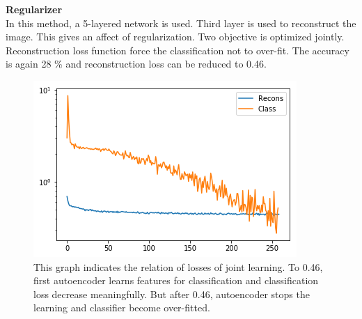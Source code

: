 \documentclass[12pt, letterpaper]{article}
\begin{document}
\textbf{Regularizer} \\
	In this method, a 5-layered network is used. Third layer is used to reconstruct the image. This gives an affect of regularization. Two objective is optimized jointly. Reconstruction loss function force the classification not to over-fit. The accuracy is again 28 \% and reconstruction loss can be reduced to 0.46. 
\begin{figure}[H]
\includegraphics[width=\textwidth]{ae-r}
    \caption{This graph indicates the relation of losses of joint learning. To 0.46, first autoencoder learns features for classification and classification loss decrease meaningfully. But after 0.46, autoencoder stops the learning and classifier become over-fitted. }
\end{figure}
\end{document}
